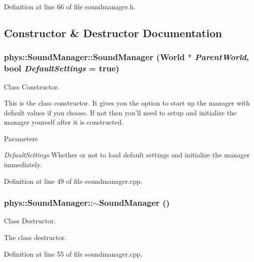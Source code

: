 Definition at line 66 of file soundmanager.h.



\subsection{Constructor \& Destructor Documentation}
\hypertarget{classphys_1_1SoundManager_a134f60dd79d8049f37b076f63b5e7eaf}{
\subsubsection[{SoundManager}]{\setlength{\rightskip}{0pt plus 5cm}phys::SoundManager::SoundManager ({\bf World} $\ast$ {\em ParentWorld}, \/  bool {\em DefaultSettings} = {\ttfamily true})}}
\label{d1/dc4/classphys_1_1SoundManager_a134f60dd79d8049f37b076f63b5e7eaf}


Class Constructor. 

This is the class constructor. It gives you the option to start up the manager with default values if you choose. If not then you'll need to setup and initialize the manager yourself after it is constructed. 
\begin{DoxyParams}{Parameters}
\item[{\em DefaultSettings}]Whether or not to load default settings and initialize the manager immediately. \end{DoxyParams}


Definition at line 49 of file soundmanager.cpp.

\hypertarget{classphys_1_1SoundManager_af557110e5f0eccc7be861f163e1670d0}{
\subsubsection[{$\sim$SoundManager}]{\setlength{\rightskip}{0pt plus 5cm}phys::SoundManager::$\sim$SoundManager ()}}
\label{d1/dc4/classphys_1_1SoundManager_af557110e5f0eccc7be861f163e1670d0}


Class Destructor. 

The class destructor. 

Definition at line 55 of file soundmanager.cpp.



